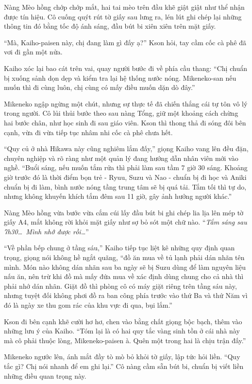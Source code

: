 ﻿\documentclass[../main.tex]{subfiles}
\begin{document}
Nàng Mèo hồng chớp chớp mắt, hai tai mèo trên đầu khẽ giật giật như thể nhận được tín hiệu. Cô cuống quýt rút tờ giấy sau lưng ra, lén lút ghi chép lại những thông tin đó bằng tốc độ ánh sáng, đầu bút bi xiên xiên trên mặt giấy.

``Mà, Kaiho-paisen này, chị đang làm gì đấy ạ?'' Kson hỏi, tay cầm cốc cà phê đã vơi đi gần một nửa.

Kaiho xóc lại bao cát trên vai, quay người bước đi về phía cầu thang: ``Chị chuẩn bị xuống sảnh dọn dẹp và kiểm tra lại hệ thống nước nóng. Mikeneko-san nếu muốn thì đi cùng luôn, chị cùng có mấy điều muốn dặn dò đây.''

Mikeneko ngập ngừng một chút, nhưng sự thực tế đã chiến thắng cái tự tôn vô lý trong người. Cô lủi thủi bước theo sau nàng Tổng, giữ một khoảng cách chừng hai bước chân, như học sinh đi sau giáo viên. Kson thì thong thả đi sóng đôi bên cạnh, vừa đi vừa tiếp tục nhâm nhi cốc cà phê chưa hết.

``Quy củ ở nhà Hikawa này cũng nghiêm lắm đấy,'' giọng Kaiho vang lên đều đặn, chuyên nghiệp và rõ ràng như một quản lý đang hướng dẫn nhân viên mới vào nghề. ``Buổi sáng, nếu muốn tắm rửa thì phải làm sau tầm 7 giờ 30 sáng. Khoảng giờ trước đó là thời điểm bọn trẻ - Ryuu, Suzu và Nao - chuẩn bị đi học và Aniki chuẩn bị đi làm, bình nước nóng tầng trung tâm sẽ bị quá tải. Tắm tối thì tự do, nhưng không khuyến khích tắm đêm sau 11 giờ, gây ảnh hưởng người khác.''

Nàng Mèo hồng vừa bước vừa cắm cúi lấy đầu bút bi ghi chép lia lịa lên mép tờ giấy A4, mắt không rời khỏi mặt giấy như sợ bỏ sót một chữ nào. ``\textit{Tắm sáng sau 7h30\dots\ Mình nhớ được rồi\dots}''

``Về phần bếp chung ở tầng sáu,'' Kaiho tiếp tục liệt kê những quy định quan trọng, giọng nói không hề ngắt quãng, ``đồ ăn mua về tủ lạnh phải dán nhãn tên mình. Món nào không dán nhãn sau ba ngày sẽ bị Suzu dùng để làm nguyên liệu nấu ăn, nên trừ khi đồ mà mấy đứa mua về xác định dùng chung cho cả nhà thì phải nhớ dán nhãn. Giặt đồ thì phòng cô có máy giặt riêng trên tầng sáu này, nhưng tuyệt đối không phơi đồ ra ban công phía trước vào thứ Ba và thứ Năm vì đó là ngày xe thu gom rác của khu vực đi qua, bụi lắm.''

Kson đi bên cạnh khẽ cười hơ hơ, chen vào bằng chất giọng bộc bạch, thêm vào những lưu ý của Kaiho. ``Tóm lại là có hai quy tắc vàng sinh tồn ở cái nhà này mà cô phải thuộc lòng, Mikeneko-paisen à. Quên một trong hai là chịu trận đấy.''

Mikeneko ngước lên, ánh mắt đầy tò mò bỏ khỏi tờ giấy, lập tức hỏi liền. ``Quy tắc gì? Chị nói nhanh để em ghi lại.'' Cô nàng cầm sẵn bút bi, chuẩn bị viết liền những điều quan trọng này.
\end{document}
